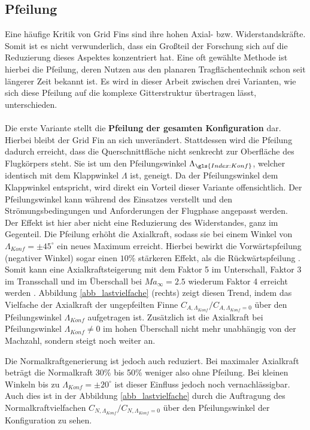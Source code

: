 \subsection{Pfeilung}
Eine häufige Kritik von Grid Fins sind ihre hohen Axial- bzw. Widerstandskräfte. Somit ist es nicht verwunderlich, dass ein Großteil der Forschung sich auf die Reduzierung dieses Aspektes konzentriert hat. Eine oft gewählte Methode ist hierbei die Pfeilung, deren Nutzen aus den planaren Tragflächentechnik schon seit längerer Zeit bekannt ist. Es wird in dieser Arbeit zwischen drei Varianten, wie sich diese Pfeilung auf die komplexe Gitterstruktur übertragen lässt, unterschieden.\\
~\\
Die erste Variante stellt die \textbf{Pfeilung der gesamten Konfiguration} dar. Hierbei bleibt der Grid Fin an sich unverändert. Stattdessen wird die Pfeilung dadurch erreicht, dass die Querschnittfläche nicht senkrecht zur Oberfläche des Flugkörpers steht. Sie ist um den Pfeilungswinkel $\Lambda_{\gls{Index:Konf}}$, welcher identisch mit dem Klappwinkel $\Lambda$ ist, geneigt. Da der Pfeilungswinkel dem Klappwinkel entspricht, wird direkt ein Vorteil dieser Variante offensichtlich. Der Pfeilungswinkel kann während des Einsatzes verstellt und den Strömungsbedingungen und Anforderungen der Flugphase angepasst werden.\\
Der Effekt ist hier aber nicht eine Reduzierung des Widerstandes, ganz im Gegenteil. Die Pfeilung erhöht die Axialkraft, sodass sie bei einem Winkel von $\Lambda_{Konf} = \pm45^\circ$ ein neues Maximum erreicht. Hierbei bewirkt die Vorwärtspfeilung (negativer Winkel) sogar einen $10\%$ stärkeren Effekt, als die Rückwärtspfeilung \cite{LambdaKonf}. Somit kann eine Axialkraftsteigerung mit dem Faktor 5 im Unterschall, Faktor 3 im Transschall und im Überschall bei $Ma_\infty = 2.5$ wiederum Faktor 4 erreicht werden \cite{LambdaKonf}. Abbildung \ref{abb_lastvielfache} (rechts) zeigt diesen Trend, indem das Vielfache der Axialkraft der ungepfeilten Finne $C_{A,\Lambda_{Konf}}/C_{A,\Lambda_{Konf}=0}$ über den Pfeilungswinkel $\Lambda_{Konf}$ aufgetragen ist. Zusätzlich ist die Axialkraft bei Pfeilungswinkel $\Lambda_{Konf} \neq 0$ im hohen Überschall nicht mehr unabhängig von der Machzahl, sondern steigt noch weiter an.

Die Normalkraftgenerierung ist jedoch auch reduziert. Bei maximaler Axialkraft beträgt die Normalkraft 30\% bis 50\% weniger also ohne Pfeilung. Bei kleinen Winkeln bis zu $\Lambda_{Konf} = \pm20^\circ$ ist dieser Einfluss jedoch noch vernachlässigbar. Auch dies ist in der Abbildung \ref{abb_lastvielfache} durch die Auftragung des Normalkraftvielfachen $C_{N,\Lambda_{Konf}}/C_{N,\Lambda_{Konf}=0}$ über den Pfeilungswinkel der Konfiguration zu sehen.

